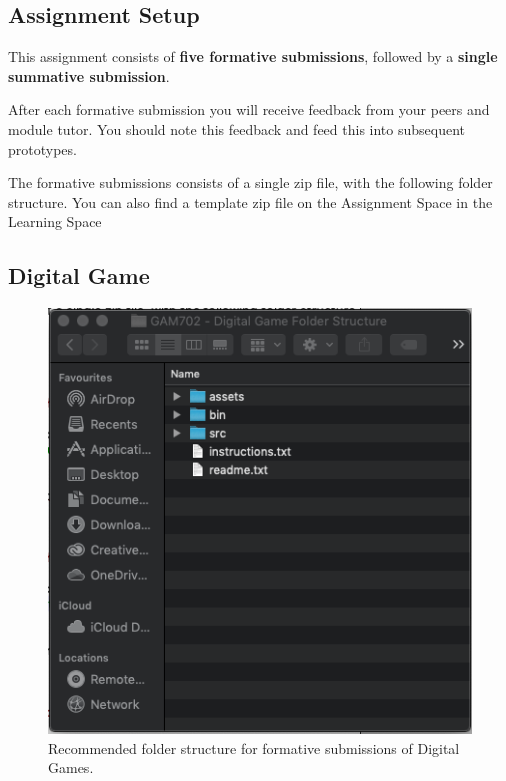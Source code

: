 \documentclass{../../fal_assignment}
\begin{document}
\subsection*{Assignment Setup} 

This assignment consists of \textbf{five formative submissions}, followed by a \textbf{single summative submission}.

After each formative submission you will receive feedback from your peers and module tutor. You should note this feedback and feed this into subsequent prototypes.  

The formative submissions consists of a single zip file, with the following folder structure. You can also find a template zip file on the Assignment Space in the Learning Space

\pagebreak
\subsection*{Digital Game} 

\begin{figure}[H]
	\begin{center}
		\includegraphics[height=0.4\textheight]{digital_games_folder_structure}
	\end{center}
	\caption{Recommended folder structure for formative submissions of Digital Games.}
	\label{fig:digital_game_folder_structure}
\end{figure}
\end{document}
